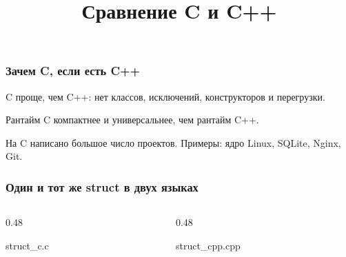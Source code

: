 \documentclass[compress, 8pt, aspectratio=169]{beamer}
\title{Сравнение C и C++}
\begin{document}
\frame[plain]{\titlepage}

\begin{frame}

    \frametitle{Зачем C, если есть C++}

    \begin{myitemize}

        \item C проще, чем C++: нет классов, исключений,
            конструкторов и перегрузки.

        \item Рантайм C компактнее и универсальнее, чем
            рантайм C++.

        \item На C написано большое число проектов. Примеры:
            ядро Linux, SQLite, Nginx, Git.

    \end{myitemize}

\end{frame}

\begin{frame}[fragile]

    \frametitle{Один и тот же struct в двух языках}

    \begin{columns}[T]

        \begin{column}{0.48\textwidth}

                {struct_c.c}

        \end{column}

        \begin{column}{0.48\textwidth}

                {struct_cpp.cpp}

        \end{column}

    \end{columns}

\end{frame}
\end{document}
